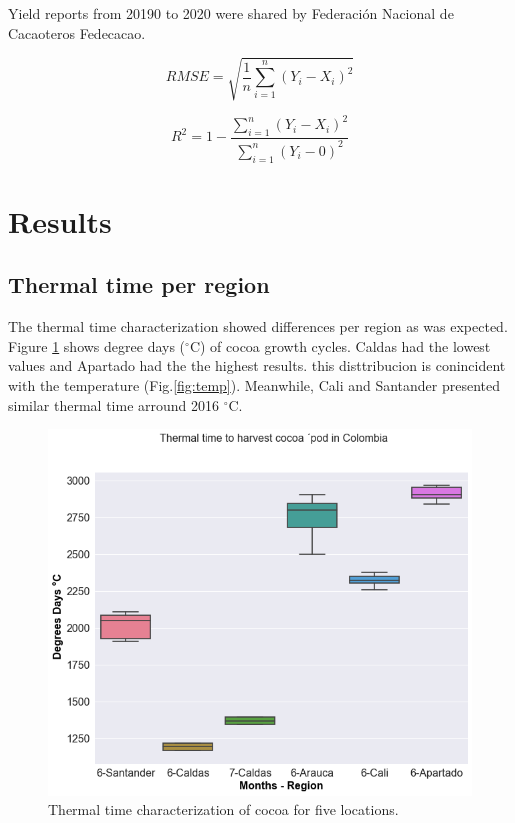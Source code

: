 \documentclass[gene,journal,article,submit,moreauthors,pdftex]{Definitions/mdpi}
\begin{document}
Yield reports from 20190 to 2020  were shared by Federación Nacional de Cacaoteros Fedecacao. 

\begin{equation}
RMSE= \sqrt{\frac{1}{n}  \sum_{i=1}^{n} (Y_{i}-X_{i})^{2} } 
\label{equ:RMSE}
\end{equation}

\begin{equation}
R^{2}= 1- \frac{\sum_{i=1}^{n} (Y_{i}-X_{i})^{2}}{{\sum_{i=1}^{n}(Y_{i}-0)}^{2}}
\label{equ:R2}
\end{equation}

\section{Results}

\subsection{Thermal time per region}
The thermal time characterization showed differences per region as was expected. Figure \ref{fig:ttbox} shows degree days ($^\circ$C) of cocoa growth cycles. Caldas had the lowest values and Apartado had the the highest results. this disttribucion is conincident with the temperature (Fig.\ref{fig:temp}). Meanwhile, Cali and Santander presented similar thermal time arround 2016 $^\circ$C.

\begin{figure}[h!]
	\centering
	\includegraphics[scale=0.25]{images/ttbbox.png}
	\caption{\footnotesize {Thermal time characterization of cocoa for five locations.\\}} 
	\label{fig:ttbox}
\end{figure}
\end{document}
